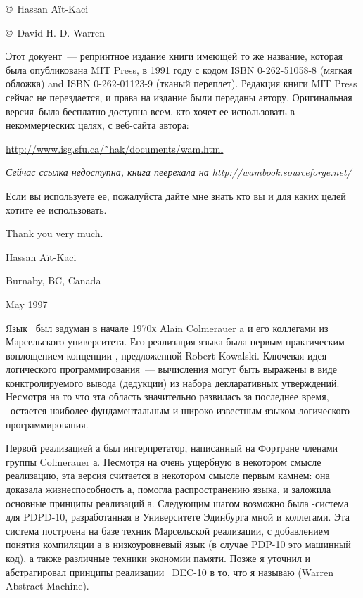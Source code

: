 \label{warren}\secdown


\copyright\ Hassan A\"it-Kaci 

\copyright\ David H. D. Warren


Этот докуент\ --- репринтное издание книги имеющей то же название, которая была
опубликована MIT Press, в 1991 году с кодом ISBN 0-262-51058-8 (мягкая обложка)
and ISBN 0-262-01123-9 (тканый переплет). Редакция книги MIT Press сейчас
не перездается, и права на издание были переданы автору.
Оригинальная версия\
была бесплатно доступна всем, кто хочет ее использовать в некоммерческих целях,
с веб-сайта автора:

\bigskip
\url{http://www.isg.sfu.ca/˜hak/documents/wam.html}
\bigskip

\textit{Сейчас ссылка недоступна, книга пеерехала на
\url{http://wambook.sourceforge.net/}}

\bigskip
Если вы используете ее, пожалуйста дайте мне знать кто вы и для каких целей
хотите ее использовать.

\bigskip
Thank you very much.

\bigskip
Hassan A\"it-Kaci

Burnaby, BC, Canada

May 1997


Язык \prolog\ был задуман в начале 1970х Alain Colmerauer a и его коллегами из
Марсельского университета. Его реализация языка была первым практическим
воплощением концепции \term{логического программирования}, предложенной Robert
Kowalski. Ключевая идея логического программирования\ --- вычисления могут быть
выражены в виде конктролируемого вывода (дедукции) из набора декларативных
утверждений. Несмотря на то что эта область значительно развилась за последнее
время, \prolog\ остается наиболее фундаментальным и широко известным языком
логического программирования.

Первой реализацией \prolog а был интерпретатор, написанный на Фортране членами
группы Colmerauer а. Несмотря на очень ущербную в некотором смысле реализацию,
эта версия считается в некотором смысле первым камнем: она доказала
жизнеспособность \prolog а, помогла распространению языка, и заложила основные
принципы реализаций \prolog а. Следующим шагом возможно была \prolog-система для
PDPD-10, разработанная в Университете Эдинбурга мной и коллегами. Эта система
построена на базе техник Марсельской реализации, с добавлением понятия
компиляции \prolog а в низкоуровневый язык (в случае PDP-10 это машинный код), а
также различные техники экономии памяти. Позже я уточнил и абстрагировал
принципы реализации \prolog\ DEC-10 в то, что я называю \prog{WAM} (Warren
Abstract Machine).


